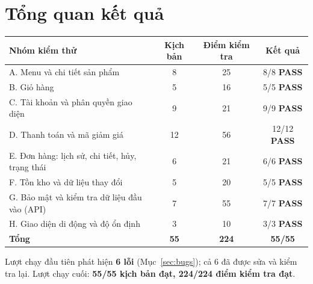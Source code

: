 \documentclass[a4paper,11pt]{article}
\newcommand{\ok}{\textcolor{okgreen}{\textbf{PASS}}}
\begin{document}
\section{Tổng quan kết quả}
\begin{longtable}{|L{7cm}|c|c|c|}\hline\textbf{Nhóm kiểm thử}&\textbf{Kịch bản}&\textbf{Điểm kiểm tra}&\textbf{Kết quả}\\\hline\endhead
A. Menu và chi tiết sản phẩm&8&25&8/8 \ok\\\hline
B. Giỏ hàng&5&16&5/5 \ok\\\hline
C. Tài khoản và phân quyền giao diện&9&21&9/9 \ok\\\hline
D. Thanh toán và mã giảm giá&12&56&12/12 \ok\\\hline
E. Đơn hàng: lịch sử, chi tiết, hủy, trạng thái&6&21&6/6 \ok\\\hline
F. Tồn kho và dữ liệu thay đổi&5&20&5/5 \ok\\\hline
G. Bảo mật và kiểm tra dữ liệu đầu vào (API)&7&55&7/7 \ok\\\hline
H. Giao diện di động và độ ổn định&3&10&3/3 \ok\\\hline
\textbf{Tổng}&\textbf{55}&\textbf{224}&\textbf{55/55}\\\hline\end{longtable}
Lượt chạy đầu tiên phát hiện \textbf{6 lỗi} (Mục~\ref{sec:bugs}); cả 6 đã được sửa và kiểm tra lại. Lượt chạy cuối: \textbf{55/55 kịch bản đạt, 224/224 điểm kiểm tra đạt}.
\end{document}
